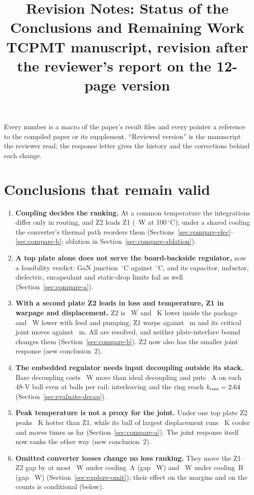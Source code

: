 \documentclass[10pt]{article}
\title{Revision Notes: Status of the Conclusions and Remaining Work\\[2pt]
\large TCPMT manuscript, revision after the reviewer's report on the 12-page version}
\author{}
\date{}
\newcommand{\degC}{\,$^\circ$C}
\newcommand{\cl}[1]{\textbf{#1}\enspace}
\begin{document}
\maketitle
\vspace{-3em}

\noindent Every number is a macro of the paper's result files and every pointer a reference to the
compiled paper or its supplement. ``Reviewed version'' is the manuscript the reviewer read; the
response letter gives the history and the corrections behind each change.

\section*{Conclusions that remain valid}
\begin{enumerate}
\item \cl{Coupling decides the ranking.} At a common temperature the integrations differ only in
routing, and Z2 leads Z1 (\WrIsoGapHiZtwo~W at 100\degC); under a shared cooling the converter's
thermal path reorders them (Sections~\ref{sec:compare-elec}--\ref{sec:compare-b}; ablation in
Section~\ref{sec:compare-ablation}).
\item \cl{A top plate alone does not serve the board-backside regulator,} now a feasibility verdict:
GaN junction \TjAZthree\degC{} against \MthLimGan\degC, and its capacitor, inductor, dielectric,
encapsulant and static-drop limits fail as well (Section~\ref{sec:compare-a}).
\item \cl{With a second plate Z2 leads in loss and temperature, Z1 in warpage and displacement.} Z2 is
\GapBZtwo~W and \dTmaxTierBZtwo~K lower inside the package and \WrPlatGapB~W lower with feed and
pumping; Z1 warps \WarpBZone{} against \WarpBZtwo~\textmu m and its critical joint moves \DuBZone{}
against \DuBZtwo~\textmu m. All are resolved, and neither plate-interface bound changes them
(Section~\ref{sec:compare-b}). Z2 now also has the smaller joint response (new conclusion~2).
\item \cl{The embedded regulator needs input decoupling outside its stack.} Bare decoupling costs
\RiseSoneZone~W more than ideal decoupling and puts \WrBgaBareAtNmaxZone~A on each 48-V ball even at
\WrBgaNmax{} balls per rail; interleaving and the ring reach $k_{\mathrm{rms}} = 2.64$
(Section~\ref{sec:evaluate-decap}).
\item \cl{Peak temperature is not a proxy for the joint.} Under one top plate Z2 peaks
\WrdTmaxAZtwo~K hotter than Z1, while its ball of largest displacement runs \WrdTjointAZtwo~K cooler
and moves \WrDuRatioAZtwo{} times as far (Section~\ref{sec:compare-a}). The joint response itself now ranks the
other way (new conclusion~2).
\item \cl{Omitted converter losses change no loss ranking.} They move the Z1--Z2
gap by at most \WrOmitGapAHi~W under cooling~A (gap \GapAZtwo~W) and \WrOmitGapBHi~W under
cooling~B (gap \GapBZtwo~W) (Section~\ref{sec:explore-omit}); their effect on the margins and on
the counts is conditional (below).
\end{enumerate}
\end{document}
